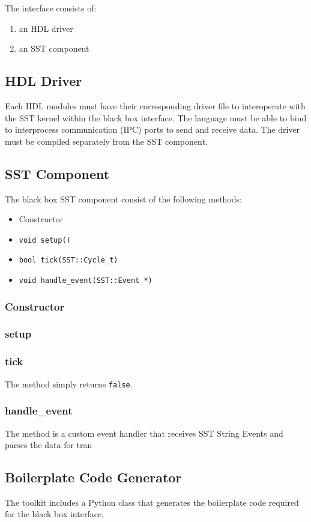 \documentclass{article}
\begin{document}
  The interface consists of:
  \begin{enumerate}
    \item an HDL driver
    \item an SST component
  \end{enumerate}

    \subsection{HDL Driver}
    Each HDL modules must have their corresponding driver file to interoperate with the SST kernel
    within the black box interface. The language must be able to bind to interprocess communication
    (IPC) ports to send and receive data. The driver must be compiled separately from the SST
    component.

    \subsection{SST Component}
    The black box SST component consist of the following methods:
    \begin{itemize}
      \item Constructor
      \item \texttt{void setup()}
      \item \texttt{bool tick(SST::Cycle\_t)}
      \item \texttt{void handle\_event(SST::Event *)}
    \end{itemize}

      \subsubsection{Constructor}
      \subsubsection{setup}
      \subsubsection{tick}
      The method simply returns \texttt{false}.

      \subsubsection{handle\_event}
      The method is a custom event handler that receives SST String Events and parses the data for tran

    \subsection{Boilerplate Code Generator}
    The toolkit includes a Python class that generates the boilerplate code required for the black
    box interface.
\end{document}
